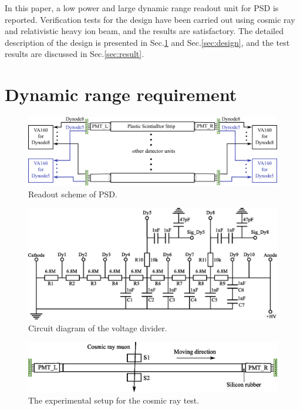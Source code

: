 \documentclass[5p, times]{elsarticle}
\begin{document}
In this paper, a low power and large dynamic range readout unit for PSD is reported.
Verification tests for the design have been carried out using cosmic ray and relativistic heavy ion beam, and the results are satisfactory.
The detailed description of the design is presented in Sec.\ref{sec:requirement} and Sec.\ref{sec:design}, and the test results are discussed in Sec.\ref{sec:result}.

\section{Dynamic range requirement}
\label{sec:requirement}

\begin{figure}
\centering
 \includegraphics[width=140mm]{readout_scheme}
\caption{Readout scheme of PSD.}
\label{fig:readout_scheme}
\end{figure} 

\begin{figure}
\centering
 \includegraphics[width=140mm]{divider}
\caption{Circuit diagram of the voltage divider.}
\label{fig:divider}
\end{figure} 

\begin{figure}[t]
 \centering
 \includegraphics[width=140mm]{cosmic_test}
\caption{The experimental setup for the cosmic ray test.}
\label{fig:cosmic_test}
\end{figure} 
\end{document}
